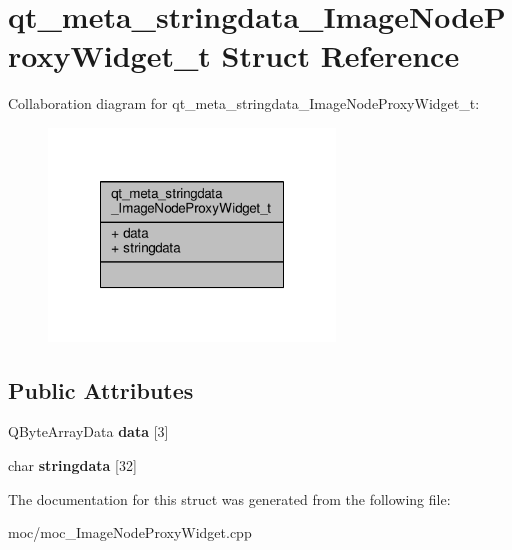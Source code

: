 \hypertarget{structqt__meta__stringdata___image_node_proxy_widget__t}{\section{qt\-\_\-meta\-\_\-stringdata\-\_\-\-Image\-Node\-Proxy\-Widget\-\_\-t Struct Reference}
\label{structqt__meta__stringdata___image_node_proxy_widget__t}
}


Collaboration diagram for qt\-\_\-meta\-\_\-stringdata\-\_\-\-Image\-Node\-Proxy\-Widget\-\_\-t\-:
\nopagebreak
\begin{figure}[H]
\begin{center}
\leavevmode
\includegraphics[width=216pt]{structqt__meta__stringdata___image_node_proxy_widget__t__coll__graph}
\end{center}
\end{figure}
\subsection*{Public Attributes}
\begin{DoxyCompactItemize}
\item 
\hypertarget{structqt__meta__stringdata___image_node_proxy_widget__t_a57ad13d793baf44f3b5f8477140b49ee}{Q\-Byte\-Array\-Data {\bfseries data} \mbox{[}3\mbox{]}}\label{structqt__meta__stringdata___image_node_proxy_widget__t_a57ad13d793baf44f3b5f8477140b49ee}

\item 
\hypertarget{structqt__meta__stringdata___image_node_proxy_widget__t_a356f305dba2ce0f31a06f1bb98b8fc06}{char {\bfseries stringdata} \mbox{[}32\mbox{]}}\label{structqt__meta__stringdata___image_node_proxy_widget__t_a356f305dba2ce0f31a06f1bb98b8fc06}

\end{DoxyCompactItemize}


The documentation for this struct was generated from the following file\-:\begin{DoxyCompactItemize}
\item 
moc/moc\-\_\-\-Image\-Node\-Proxy\-Widget.\-cpp\end{DoxyCompactItemize}
